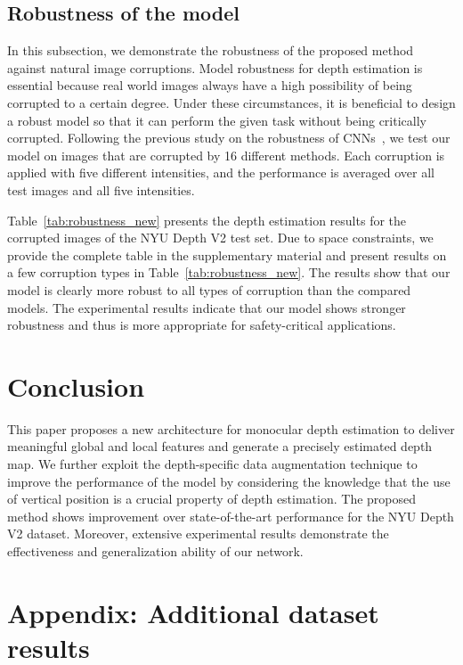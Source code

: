 \documentclass{article}
\makeatletter
\let\@internalcite\cite
\def\cite{\def\citeauthoryear##1##2{##1, ##2}\@internalcite}
\makeatother
\begin{document}
\subsection{Robustness of the model}
In this subsection, we demonstrate the robustness of the proposed method against natural image corruptions. Model robustness for depth estimation is essential because real world images always have a high possibility of being corrupted to a certain degree. Under these circumstances, it is beneficial to design a robust model so that it can perform the given task without being critically corrupted.
Following the previous study on the robustness of CNNs~\cite{hendrycks2018benchmarking}, we test our model on images that are corrupted by 16 different methods.
Each corruption is applied with five different intensities, and the performance is averaged over all test images and all five intensities.

Table~\ref{tab:robustness_new} presents the depth estimation results for the corrupted images of the NYU Depth V2 test set. Due to space constraints, we provide the complete table in the supplementary material and present results on a few corruption types in Table~\ref{tab:robustness_new}. 
The results show that our model is clearly more robust to all types of corruption than the compared models.
The experimental results indicate that our model shows stronger robustness and thus is more appropriate for safety-critical applications.





\section{Conclusion}

This paper proposes a new architecture for monocular depth estimation to deliver meaningful global and local features and generate a precisely estimated depth map. 
We further exploit the depth-specific data augmentation technique to improve the performance of the model by considering the knowledge that the use of vertical position is a crucial property of depth estimation. 
The proposed method shows improvement over state-of-the-art performance for the NYU Depth V2 dataset. Moreover, extensive experimental results demonstrate the effectiveness and generalization ability of our network.




\onecolumn

\section{Appendix: Additional dataset results}
\end{document}
